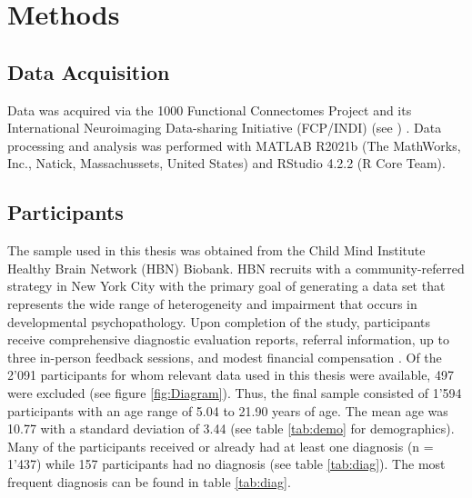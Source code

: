 \section{Methods} \label{Methods}

\subsection{Data Acquisition}
Data was acquired via the 1000 Functional Connectomes Project and its International Neuroimaging Data-sharing Initiative (FCP/INDI) (see ) \parencite{alexanderOpenResourceTransdiagnostic2017}. Data processing and analysis was performed with MATLAB R2021b (The MathWorks, Inc., Natick, Massachussets, United States) and RStudio 4.2.2 (R Core Team). 

\subsection{Participants}
The sample used in this thesis was obtained from the Child Mind Institute Healthy Brain Network (HBN) Biobank. HBN recruits with a community-referred strategy in New York City with the primary goal of generating a data set that represents the wide range of heterogeneity and impairment that occurs in developmental psychopathology. Upon completion of the study, participants receive comprehensive diagnostic evaluation reports, referral information, up to three in-person feedback sessions, and modest financial compensation \parencite{alexanderOpenResourceTransdiagnostic2017}. 
Of the 2'091 participants for whom relevant data used in this thesis were available, 497 were excluded (see figure \ref{fig:Diagram}). Thus, the final sample consisted of 1'594 participants with an age range of 5.04 to 21.90 years of age. The mean age was 10.77 with a standard deviation of 3.44 (see table \ref{tab:demo} for demographics). Many of the participants received or already had at least one diagnosis (n = 1'437) while 157 participants had no diagnosis (see table \ref{tab:diag}). The most frequent diagnosis can be found in table \ref{tab:diag}.

